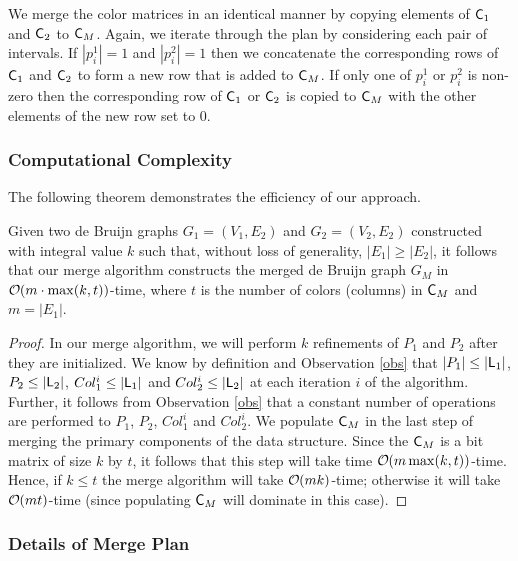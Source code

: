 We merge the color matrices in an identical manner by copying elements of $\mbox{\rm {\sf C}}_1$ and $\mbox{\rm {\sf C}}_2$ to $\mbox{\rm {\sf C}}_M$.  Again, we iterate through the plan by considering each pair of intervals. If $|p_i^1| = 1$ and $|p_i^2| = 1$ then we concatenate the corresponding rows of $\mbox{\rm {\sf C}}_1$ and $\mbox{\rm {\sf C}}_2$ to form a new row that is added to $\mbox{\rm {\sf C}}_M$.  If only one of $p_i^1$ or $p_i^2 $ is non-zero then the corresponding row of $\mbox{\rm {\sf C}}_1$ or $\mbox{\rm {\sf C}}_2$ is copied to $\mbox{\rm {\sf C}}_M$ with the other elements of the new row set to $0$.


\subsubsection{Computational Complexity}

The following theorem demonstrates the efficiency of our approach.

\begin{theorem} Given two de Bruijn graphs $G_1 = (V_1, E_2)$ and $G_2 = (V_2, E_2)$ constructed with integral value $k$ such that, without loss of generality, $|E_1| \geq |E_2|$, it follows that our merge algorithm constructs the merged de Bruijn graph $G_M$ in $\bigO(m \cdot \max(k, t))$-time, where $t$ is the number of colors (columns) in $\mbox{\rm {\sf C}}_M$ and $m = |E_1|$. \end{theorem}

\begin{proof}     In our merge algorithm, we will perform $k$ refinements of $P_1$ and $P_2$ after they are initialized. We know by definition and Observation \ref{obs} that $|P_1| \leq |\mbox{\rm {\sf L}}_1|$,  $P_2 \leq |\mbox{\rm {\sf L}}_2|$, $Col_1^i \leq |\mbox{\rm {\sf L}}_1|$ and $Col_2^i \leq |\mbox{\rm {\sf L}}_2|$ at each iteration $i$ of the algorithm.  Further, it follows from Observation \ref{obs} that a constant number of operations are performed to $P_1$,  $P_2$, $Col_1^i$ and $Col_2^i$. We populate $\mbox{\rm {\sf C}}_M$ in the last step of merging the primary components of the data structure.  Since the  $\mbox{\rm {\sf C}}_M$ is a bit matrix of size $k$ by $t$, it follows that this step will take time $\bigO(m \max(k, t))$-time.  Hence, if $k \leq t$ the merge algorithm will take $\bigO(mk)$-time; otherwise it will take $\bigO(mt)$-time (since populating $\mbox{\rm {\sf C}}_M$ will dominate in this case).
\end{proof}

\subsubsection{Details of Merge Plan}
                        \label{merge_plan}

